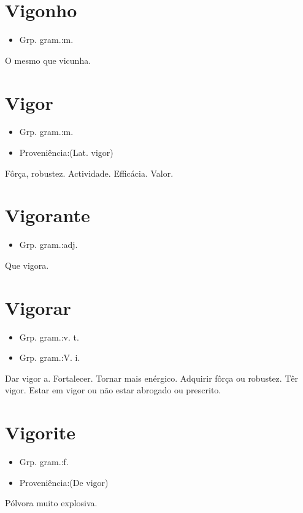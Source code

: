 \documentclass{article}
\begin{document}
\section{Vigonho}
\begin{itemize}
\item {Grp. gram.:m.}
\end{itemize}
O mesmo que \textunderscore vicunha\textunderscore .
\section{Vigor}
\begin{itemize}
\item {Grp. gram.:m.}
\end{itemize}
\begin{itemize}
\item {Proveniência:(Lat. \textunderscore vigor\textunderscore )}
\end{itemize}
Fôrça, robustez.
Actividade.
Efficácia.
Valor.
\section{Vigorante}
\begin{itemize}
\item {Grp. gram.:adj.}
\end{itemize}
Que vigora.
\section{Vigorar}
\begin{itemize}
\item {Grp. gram.:v. t.}
\end{itemize}
\begin{itemize}
\item {Grp. gram.:V. i.}
\end{itemize}
Dar vigor a.
Fortalecer.
Tornar mais enérgico.
Adquirir fôrça ou robustez.
Têr vigor.
Estar em vigor ou não estar abrogado ou prescrito.
\section{Vigorite}
\begin{itemize}
\item {Grp. gram.:f.}
\end{itemize}
\begin{itemize}
\item {Proveniência:(De \textunderscore vigor\textunderscore )}
\end{itemize}
Pólvora muito explosiva.
\end{document}
